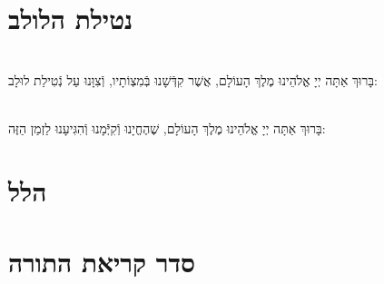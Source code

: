 \documentclass[twoside, openany, parskip=half, 11pt]{book}
\begin{document}
\shabbossimshalom

\tachanunim

\vfill

\\
\\

\clearpage

\section[נטילת הלולב]{ נטילת הלולב }

\\
בָּרוּךְ אַתָּה יְיָ אֱלֹהֵינוּ מֶלֶךְ הָעוֹלָם, אֲשֶׁר קִדְּֿשָׁנוּ בְּֿמִצְוֹתָיו, וְֿצִוָּנוּ עַל נְֿטִילַת לוּלָב:

\vspace{.5\baselineskip}

\\
בָּרוּךְ אַתָּה יְיָ אֱלֹהֵינוּ מֶלֶךְ הָעוֹלָם, שֶׁהֶחֱיָנוּ וְֿקִיְּֿֿמָנוּ וְֿהִגִּיעָנוּ לַזְמַן הַזֶּה:

\section[הלל‎]{ הלל‎ }
\label{sometimes hallel}

\hallel{\chazzan}

\vfill

\label{shabboskaddishtiskabel}
\fullkaddish

\bigskip


\nextpage

\section[סדר קריאת התורה]{ סדר קריאת התורה }


\end{document}
